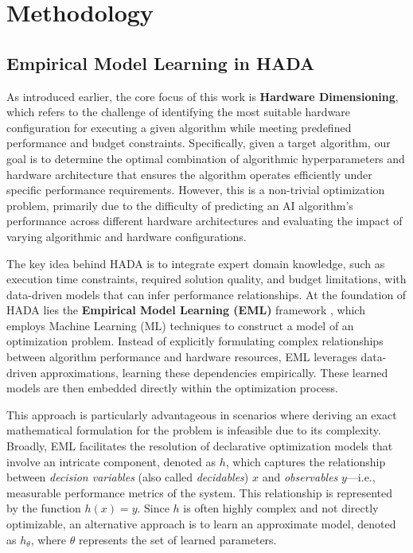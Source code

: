 \documentclass[a4paper,singleside,12pt]{report} %
\begin{document}
\chapter{Methodology}

\section{Empirical Model Learning in HADA} \label{EML-HADA}

As introduced earlier, the core focus of this work is \textbf{Hardware Dimensioning}, which refers to the challenge of identifying 
the most suitable hardware configuration for executing a given algorithm while meeting predefined performance and budget constraints.
Specifically, given a target algorithm, our goal is to determine the optimal combination of algorithmic hyperparameters and hardware
architecture that ensures the algorithm operates efficiently under specific performance requirements. However, this is a non-trivial 
optimization problem, primarily due to the difficulty of predicting an AI algorithm’s performance across different hardware architectures 
and evaluating the impact of varying algorithmic and hardware configurations.

The key idea behind HADA is to integrate expert domain knowledge, such as execution time constraints, required solution quality, and budget 
limitations, with data-driven models that can infer performance relationships. At the foundation of HADA lies the \textbf{Empirical Model 
Learning (EML)} framework \cite{LOMBARDI2017343}, which employs Machine Learning (ML) techniques to construct a model of an optimization 
problem. Instead of explicitly formulating complex relationships between algorithm performance and hardware resources, EML leverages 
data-driven approximations, learning these dependencies empirically. These learned models are then embedded directly within the 
optimization process.

This approach is particularly advantageous in scenarios where deriving an exact mathematical formulation for the problem is infeasible 
due to its complexity. Broadly, EML facilitates the resolution of declarative optimization models that involve an intricate component, 
denoted as $h$, which captures the relationship between \textit{decision variables} (also called \textit{decidables}) $x$ and 
\textit{observables} $y$—i.e., measurable performance metrics of the system. This relationship is represented by the function $h(x) = y$. 
Since $h$ is often highly complex and not directly optimizable, an alternative approach is to learn an approximate model, denoted as 
$h_{\theta}$, where $\theta$ represents the set of learned parameters.
\end{document}
